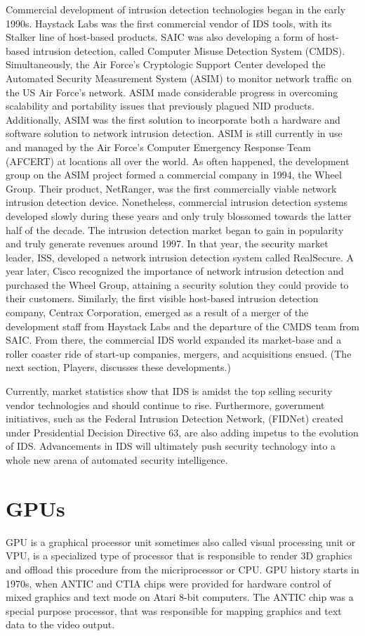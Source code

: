 \documentclass[thesis=M,english]{FITthesis}[2011/07/15]
\begin{document}
Commercial development of intrusion detection technologies began in the early 1990s. Haystack Labs was the first commercial vendor of IDS tools, with its Stalker line of host-based products. SAIC was also developing a form of host-based intrusion detection, called Computer Misuse Detection System (CMDS). Simultaneously, the Air Force's Cryptologic Support Center developed the Automated Security Measurement System (ASIM) to monitor network traffic on the US Air Force's network. ASIM made considerable progress in overcoming scalability and portability issues that previously plagued NID products. Additionally, ASIM was the first solution to incorporate both a hardware and software solution to network intrusion detection. ASIM is still currently in use and managed by the Air Force's Computer Emergency Response Team (AFCERT) at locations all over the world. As often happened, the development group on the ASIM project formed a commercial company in 1994, the Wheel Group. Their product, NetRanger, was the first commercially viable network intrusion detection device. Nonetheless, commercial intrusion detection systems developed slowly during these years and only truly blossomed towards the latter half of the decade.
The intrusion detection market began to gain in popularity and truly generate revenues around 1997. In that year, the security market leader, ISS, developed a network intrusion detection system called RealSecure. A year later, Cisco recognized the importance of network intrusion detection and purchased the Wheel Group, attaining a security solution they could provide to their customers. Similarly, the first visible host-based intrusion detection company, Centrax Corporation, emerged as a result of a merger of the development staff from Haystack Labs and the departure of the CMDS team from SAIC. From there, the commercial IDS world expanded its market-base and a roller coaster ride of start-up companies, mergers, and acquisitions ensued. (The next section, Players, discusses these developments.)

Currently, market statistics show that IDS is amidst the top selling security vendor technologies and should continue to rise. Furthermore, government initiatives, such as the Federal Intrusion Detection Network, (FIDNet) created under Presidential Decision Directive 63, are also adding impetus to the evolution of IDS. Advancements in IDS will ultimately push security technology into a whole new arena of automated security intelligence.

\section{GPUs}
GPU is a graphical processor unit sometimes also called visual processing unit or VPU, is a specialized type of processor that is responsible to render 3D graphics and offload this procedure from the micriprocessor or CPU. GPU history starts in 1970s, when ANTIC and CTIA chips were provided for hardware control of mixed graphics and text mode on Atari 8-bit computers. The ANTIC chip was a special purpose processor, that was responsible for mapping graphics and text data to the video output.
\end{document}
